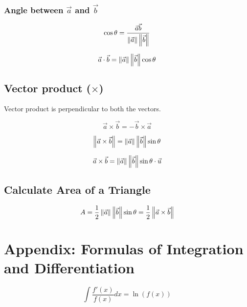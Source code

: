 \documentclass[a4paper,9pt]{scrartcl}
\begin{document}
    \subsubsection{Angle between $\vec{a}$ and $\vec{b}$}
    \begin{displaymath}
        \cos\theta = \frac{\vec{a}\vec{b}}{\left\| \vec{a} \right\|\left\| \vec{b} \right\|}
    \end{displaymath}

    \begin{displaymath}
        \vec{a}\cdot\vec{b} = \left\| \vec{a} \right\|\left\| \vec{b} \right\|\cos\theta
    \end{displaymath}

    \subsection{Vector product ($\times$)}
    Vector product is perpendicular to both the vectors.

    \begin{displaymath}
        \vec{a}\times\vec{b} = -\vec{b}\times\vec{a}
    \end{displaymath}

    \begin{displaymath}
        \left\| \vec{a}\times\vec{b} \right\| = \left\| \vec{a} \right\|\left\| \vec{b} \right\|\sin\theta
    \end{displaymath}

    \begin{displaymath}
        \vec{a}\times\vec{b} = \left\| \vec{a} \right\|\left\| \vec{b} \right\|\sin\theta\cdot\vec{u}
    \end{displaymath}

    \subsection{Calculate Area of a Triangle}
    \begin{displaymath}
        A = \frac{1}{2}\left\| \vec{a} \right\|\left\| \vec{b} \right\|\sin\theta = \frac{1}{2}\left\| \vec{a}\times\vec{b} \right\|
    \end{displaymath}


    \section{Appendix: Formulas of Integration and Differentiation}

    \begin{displaymath}
        \int \frac{f'(x)}{f(x)} dx = \ln(f(x))
    \end{displaymath}
\end{document}
